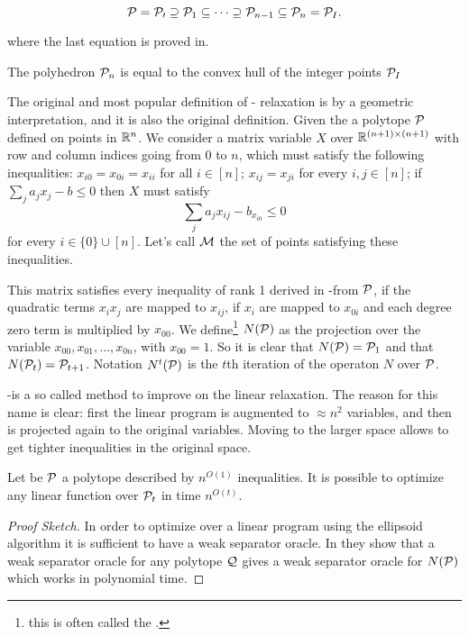 \documentclass[a4paper,twoside,justified]{tufte-handout}
\begin{document}
\begin{equation}
  \mathcal{P}=\mathcal{P_{0}} \supseteq \mathcal{P}_{1} \subseteq \cdots
  \supseteq \mathcal{P}_{n-1} \subseteq \mathcal{P}_{n}=\mathcal{P}_{I}.
\end{equation}

where the last equation is proved in\cite{lovasz1991cones}.

\begin{theorem}
  The polyhedron $ \mathcal{P}_{n} $ is equal to the convex hull of
  the integer points  $ \mathcal{P}_{I} $
\end{theorem}

The original and most popular definition of \Lovasz-\Schrijver
relaxation is by a geometric interpretation, and it is also the original definition. Given the a
polytope $ \mathcal{P} $ defined on points in $ \mathbb{R}^{n} $. We consider a
matrix variable $X$ over $ \mathbb{R}^{(n+1)\times(n+1)} $ with row and
column indices going from $ 0 $ to $ n $, which must satisfy the
following inequalities: $ x_{i0} = x_{0i} = x_{ii} $ for all $ i \in
[n] $; $ x_{ij}=x_{ji} $ for every $ i,j \in [n]$; if $
\sum_{j}a_{j}x_{j} - b \leq 0 $ then $ X $ must satisfy 
\begin{equation*}
  \sum_{j}a_{j}x_{ij} - b_{x_{i0}} \leq 0
\end{equation*}
for every $ i \in \{0\}\cup[n]$. Let's call $ \mathcal{M} $ the set of
points satisfying these inequalities.

This matrix satisfies every inequality of rank 1 derived in
\Lovasz-\Schrijver from $\mathcal{P}$, if the quadratic terms $ x_{i}x_{j}
$ are mapped to $ x_{ij} $, if $ x_{i} $ are mapped to $ x_{0i} $ and
each degree zero term is multiplied by $ x_{00} $. We
define\footnote{this is often called the
  .}  $ N(\mathcal{P}) $ as the
projection over the variable $ x_{00},x_{01},\ldots, x_{0n} $, with $
x_{00}=1 $. So it is clear that $ N(\mathcal{P})=\mathcal{P}_{1} $ and that $
N(\mathcal{P}_{t})=\mathcal{P}_{t+1} $. Notation $ N^{t}(\mathcal{P}) $ is the $ t
$th iteration of the operaton $ N $ over $ \mathcal{P} $.

\Lovasz-\Schrijver is a so called 
method to improve on the linear relaxation. The reason for this name
is clear: first the linear program is augmented to $ \approx n^{2} $
variables, and then is projected again to the original
variables. Moving to the larger space allows to get tighter
inequalities in the original space.

\begin{theorem}\cite{lovasz1991cones}
  Let be $\mathcal{P}$ a polytope described by $ n^{O(1)} $
  inequalities. It is possible to optimize any linear function over $
  \mathcal{P}_{t} $ in time $ n^{O(t)} $.
\end{theorem}
\begin{proof}[Proof Sketch]
  In order to optimize over a linear program using the ellipsoid
  algorithm it is sufficient to have a weak separator
  oracle. In\cite{lovasz1991cones} they show that a weak separator
  oracle for any polytope $ \mathcal{Q} $ gives a weak separator oracle
  for $ N(\mathcal{P}) $ which works in polynomial time.
\end{proof}
\end{document}
